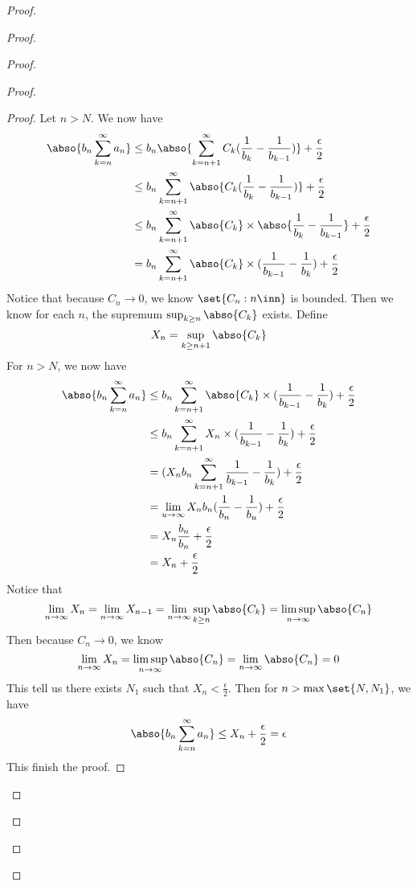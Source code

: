 \documentclass{report}
\begin{document}
\begin{proof}
\begin{proof}
\begin{proof}
\begin{proof}
\begin{proof}
Let $n>N$. We now have
 \begin{align}
   \abso{b_n\sum_{k=n}^\infty a_n}&\leq b_n\abso{\sum_{k=n+1}^\infty C_k(\frac{1}{b_k}-\frac{1}{b_{k-1}})}+\frac{\epsilon}{2}\\
&\leq b_n\sum_{k=n+1}^\infty \abso{C_k(\frac{1}{b_k}-\frac{1}{b_{k-1}})}+\frac{\epsilon}{2}\\
&\leq b_n\sum_{k=n+1}^\infty \abso{C_k} \times\abso{\frac{1}{b_k}-\frac{1}{b_{k-1}}}+\frac{\epsilon}{2}\\
&= b_n\sum_{k=n+1}^\infty \abso{C_k}\times (\frac{1}{b_{k-1}}-\frac{1}{b_k})+\frac{\epsilon}{2}
\end{align}
Notice that because $C_n\to 0$, we know  $\set{C_n:n\inn}$ is bounded. Then we know for each $n$, the supremum  $\sup_{k\geq n} \abso{C_k}$ exists. Define
\begin{equation}
X_n=\sup_{k\geq n+1}\abso{C_k}
\end{equation}
For $n>N$, we now have
 \begin{align}
   \abso{b_n\sum_{k=n}^\infty a_n}&\leq b_n\sum_{k=n+1}^\infty \abso{C_k}\times (\frac{1}{b_{k-1}}-\frac{1}{b_k})+\frac{\epsilon}{2}\\
                                  &\leq b_n\sum_{k=n+1}^\infty X_n \times (\frac{1}{b_{k-1}}-\frac{1}{b_k})+\frac{\epsilon}{2}\\
   &=(X_nb_n\sum_{k=n+1}^\infty \frac{1}{b_{k-1}}-\frac{1}{b_k}) +\frac{\epsilon}{2}\\
   &=\lim_{u\to\infty} X_nb_n (\frac{1}{b_n}-\frac{1}{b_u})+\frac{\epsilon}{2}\\
   &=X_n \frac{b_n}{b_n}+\frac{\epsilon}{2}\\
   &=X_n+\frac{\epsilon}{2}
\end{align}
Notice that 
\begin{equation}
\lim_{n\to\infty}X_n=\lim_{n\to\infty}X_{n-1}=\lim_{n\to\infty}\sup_{k\geq n}\abso{C_k}=\limsup_{n\to\infty} \abso{C_n}
\end{equation}
Then because $C_n\to 0$, we know 
 \begin{equation}
\lim_{n\to\infty}X_n=\limsup_{n\to\infty} \abso{C_n}=\lim_{n\to\infty}\abso{C_n}=0
\end{equation}
This tell us there exists $N_1$ such that  $X_n<\frac{\epsilon}{2}$. Then for $n>\max \set{N,N_1}$, we have
\begin{equation}
\abso{b_n\sum_{k=n}^\infty a_n}\leq X_n+\frac{\epsilon}{2}=\epsilon 
\end{equation}
This finish the proof. 
\end{proof}

\end{proof}
\end{proof}
\end{proof}
\end{proof}
\end{document}
